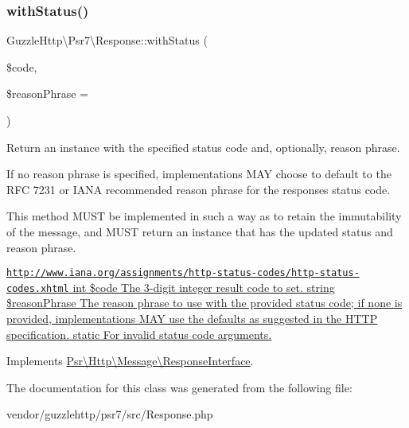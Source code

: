 \subsubsection{\texorpdfstring{with\+Status()}{withStatus()}}
{\footnotesize\ttfamily Guzzle\+Http\textbackslash{}\+Psr7\textbackslash{}\+Response\+::with\+Status (\begin{DoxyParamCaption}\item[{}]{\$code,  }\item[{}]{\$reason\+Phrase = {\ttfamily \textquotesingle{}\textquotesingle{}} }\end{DoxyParamCaption})}

Return an instance with the specified status code and, optionally, reason phrase.

If no reason phrase is specified, implementations M\+AY choose to default to the R\+FC 7231 or I\+A\+NA recommended reason phrase for the response\textquotesingle{}s status code.

This method M\+U\+ST be implemented in such a way as to retain the immutability of the message, and M\+U\+ST return an instance that has the updated status and reason phrase.

\hyperlink{}{\href{http://www.iana.org/assignments/http-status-codes/http-status-codes.xhtml}{\tt http\+://www.\+iana.\+org/assignments/http-\/status-\/codes/http-\/status-\/codes.\+xhtml}  int \$code The 3-\/digit integer result code to set.  string \$reason\+Phrase The reason phrase to use with the provided status code; if none is provided, implementations M\+AY use the defaults as suggested in the H\+T\+TP specification.  static   For invalid status code arguments. }

Implements \hyperlink{interfacePsr_1_1Http_1_1Message_1_1ResponseInterface_ae79c87a0cd82e000a5e1bb4dbee739da}{Psr\textbackslash{}\+Http\textbackslash{}\+Message\textbackslash{}\+Response\+Interface}.



The documentation for this class was generated from the following file\+:\begin{DoxyCompactItemize}
\item 
vendor/guzzlehttp/psr7/src/Response.\+php\end{DoxyCompactItemize}
